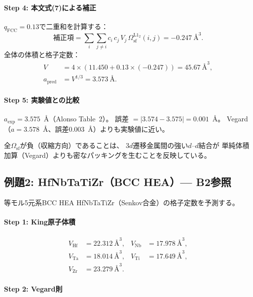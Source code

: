 \documentclass[5p,10pt]{elsarticle}
\begin{document}
\paragraph{Step 4: 本文式(7)による補正}

$q_\text{FCC} = 0.13$で二重和を計算する：
\begin{equation}
\text{補正項} = \sum_i \sum_{j \ne i} c_i\,c_j\,V_j\,\Omega_\text{sf}^{\text{L1}_2}(i,j)
= -0.247~\text{\AA}^3.
\label{eq:ex_correction_fcc}
\end{equation}
全体の体積と格子定数：
\begin{align}
V &= 4 \times (11.450 + 0.13 \times (-0.247)) = 45.67~\text{\AA}^3, \nonumber \\
a_\text{pred} &= V^{1/3} = 3.573~\text{\AA}. \label{eq:ex_pred_fcc}
\end{align}

\paragraph{Step 5: 実験値との比較}

$a_\text{exp} = 3.575$~\AA{}（Alonso Table~2）。
誤差 $= |3.574 - 3.575| = 0.001$~\AA{}。
Vegard（$a = 3.578$~\AA、誤差0.003~\AA）よりも実験値に近い。

\medskip
\noindent
全$\Omega_\text{sf}$が負（収縮方向）であることは、
3$d$遷移金属間の強い$d$--$d$結合が
単純体積加算（Vegard）よりも密なパッキングを生むことを反映している。


\subsection{例題2: HfNbTaTiZr（BCC HEA）--- B2参照}
\label{sec:example_bcc}

等モル5元系BCC HEA HfNbTaTiZr（Senkov合金）の格子定数を予測する。

\paragraph{Step 1: King原子体積}
\begin{align*}
V_\text{Hf} &= 22.312~\text{\AA}^3, & V_\text{Nb} &= 17.978~\text{\AA}^3, \\
V_\text{Ta} &= 18.014~\text{\AA}^3, & V_\text{Ti} &= 17.649~\text{\AA}^3, \\
V_\text{Zr} &= 23.279~\text{\AA}^3. &
\end{align*}

\paragraph{Step 2: Vegard則}
\end{document}
